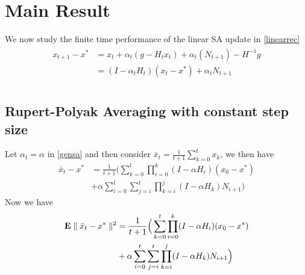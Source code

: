 \section{Main Result}
\begin{theorem}
\end{theorem}

We now study the finite time performance of the linear SA update in \eqref{linearrec}
\begin{align*}
\begin{split}
x_{t+1}-x^*
&=x_t+\alpha_t(g-H_t x_t)+\alpha_t(N_{t+1})-H^{-1}g\\
&=(I-\alpha_t H_t)(x_t-x^*)+\alpha_t N_{t+1}\\
\end{split}
\end{align*}
\subsection{Rupert-Polyak Averaging with constant step size}
Let $\alpha_t=\alpha$ in \eqref{gensa} and then consider $\bar{x}_t=\frac{1}{t+1}\sum_{k=0}^t x_k$, we then have
\begin{align*}
\bar{x}_t-x^*&=\frac{1}{t+1}\Big(\sum_{k=0}^t\prod_{i=0}^k (I-\alpha H_i) (x_0-x^*)\\&+\alpha \sum_{i=0}^t \sum_{j=i}^{t} \prod_{k=i}^j(I-\alpha H_k) N_{i+1}\Big)
\end{align*}
Now we have 
\begin{align*}
\mathbf{E}\parallel\bar{x}_t-x^*\parallel^2&=\frac{1}{t+1}\Big(\sum_{k=0}^t\prod_{i=0}^k (I-\alpha H_i) (x_0-x^*)\\&+\alpha \sum_{i=0}^t \sum_{j=i}^{t} \prod_{k=i}^j(I-\alpha H_k) N_{i+1}\Big)
\end{align*}


